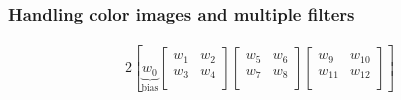 \documentclass[xcolor={table}]{beamer}
\begin{document}
\subsubsection{Handling color images and multiple filters}

 \begin{frame} 
 \begin{alignat}{2}
    \left[
  \underbrace{w_0}_{\text{bias}}
  \left[ {\begin{array}{cc}
   w_1 & w_2 \\
   w_3 & w_4 \\
  \end{array} } \right]
    \left[ {\begin{array}{cc}
   w_5 & w_6 \\
   w_7 & w_8 \\
  \end{array} } \right]
    \left[ {\begin{array}{cc}
   w_9 & w_{10} \\
   w_{11} & w_{12} \\
  \end{array} } \right]
  \right]
  \label{eqn:threedimensionalfilter}
\end{alignat}
\end{frame} 



 \begin{frame} 
 \noindent{}
\end{frame} 
\end{document}
